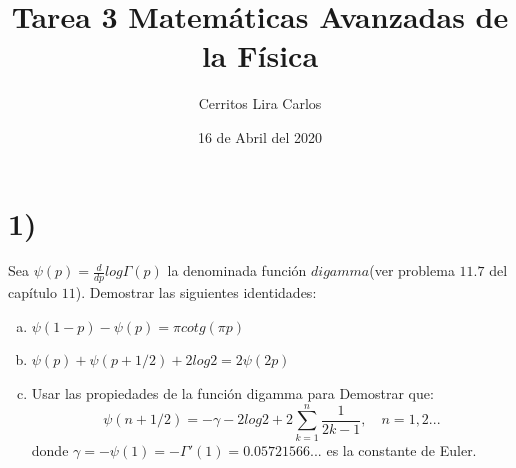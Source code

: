 \documentclass{article}
\title{Tarea 3 Matemáticas Avanzadas de la Física}
\author{Cerritos Lira Carlos}
\date{16 de Abril del 2020}
\begin{document}
\maketitle

\section*{1)}
Sea $\psi(p)=\frac{d}{dp}log \Gamma(p)$ la denominada función $digamma$(ver problema $11.7$ del 
capítulo $11$). Demostrar las siguientes identidades:
\begin{enumerate}[a)]
    \item $\psi(1-p)-\psi(p)=\pi cotg(\pi p)$
    \item $\psi(p) + \psi(p + 1/2) + 2log2 = 2\psi(2p)$
    \item Usar las propiedades de la función digamma para Demostrar que:
    \[ \psi(n+1/2) = -\gamma - 2log2 + 2\sum_{k=1}^n \frac{1}{2k-1}, \quad n=1,2...\]
    donde $\gamma = -\psi(1) = -\Gamma'(1) = 0.05721566...$ es la constante de Euler.
\end{enumerate} 
\end{document}
